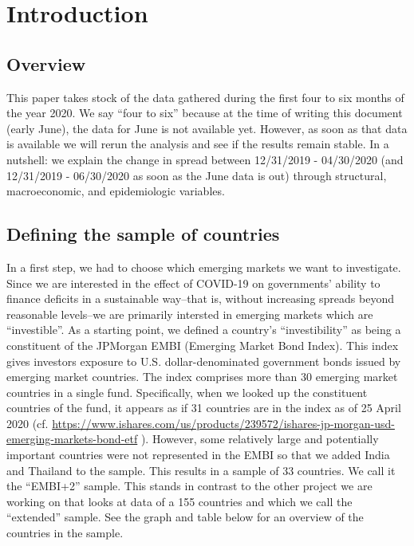 \documentclass[11pt,]{article}
\begin{document}
\vskip -8.5pt



\noindent  

\hypertarget{introduction}{%
\section{Introduction}\label{introduction}}

\hypertarget{overview}{%
\subsection{Overview}\label{overview}}

This paper takes stock of the data gathered during the first four to six
months of the year 2020. We say ``four to six'' because at the time of
writing this document (early June), the data for June is not available
yet. However, as soon as that data is available we will rerun the
analysis and see if the results remain stable. In a nutshell: we explain
the change in spread between 12/31/2019 - 04/30/2020 (and 12/31/2019 -
06/30/2020 as soon as the June data is out) through structural,
macroeconomic, and epidemiologic variables.

\hypertarget{defining-the-sample-of-countries}{%
\subsection{Defining the sample of
countries}\label{defining-the-sample-of-countries}}

In a first step, we had to choose which emerging markets we want to
investigate. Since we are interested in the effect of COVID-19 on
governments' ability to finance deficits in a sustainable way--that is,
without increasing spreads beyond reasonable levels--we are primarily
intersted in emerging markets which are ``investible''. As a starting
point, we defined a country's ``investibility'' as being a constituent
of the JPMorgan EMBI (Emerging Market Bond Index). This index gives
investors exposure to U.S. dollar-denominated government bonds issued by
emerging market countries. The index comprises more than 30 emerging
market countries in a single fund. Specifically, when we looked up the
constituent countries of the fund, it appears as if 31 countries are in
the index as of 25 April 2020 (cf.
\href{www.ishares.com/us/products/239572/ishares-jp-morgan-usd-emerging-markets-bond-etf}{https://www.ishares.com/us/products/239572/ishares-jp-morgan-usd-emerging-markets-bond-etf}
). However, some relatively large and potentially important countries
were not represented in the EMBI so that we added India and Thailand to
the sample. This results in a sample of 33 countries. We call it the
``EMBI+2'' sample. This stands in contrast to the other project we are
working on that looks at data of a 155 countries and which we call the
``extended'' sample. See the graph and table below for an overview of
the countries in the sample.
\end{document}
